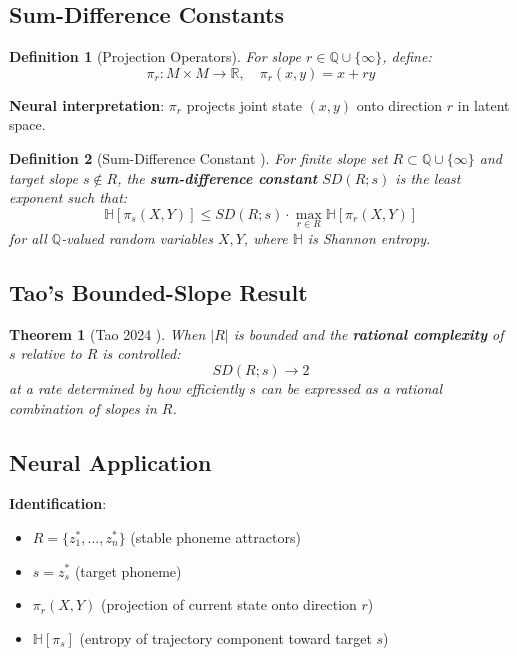 \documentclass[12pt]{article}
\newtheorem{theorem}{Theorem}
\newtheorem{definition}{Definition}
\begin{document}
\subsection{Sum-Difference Constants}

\begin{definition}[Projection Operators]
For slope $r \in \mathbb{Q} \cup \{\infty\}$, define:
\begin{equation}
\pi_r: M \times M \to \mathbb{R}, \quad \pi_r(x,y) = x + ry
\end{equation}
\end{definition}

\textbf{Neural interpretation}: $\pi_r$ projects joint state $(x,y)$ onto direction $r$ in latent space.

\begin{definition}[Sum-Difference Constant \cite{tao2024}]
For finite slope set $R \subset \mathbb{Q} \cup \{\infty\}$ and target slope $s \notin R$, the \textbf{sum-difference constant} $SD(R;s)$ is the least exponent such that:
\begin{equation}
\mathbb{H}[\pi_s(X,Y)] \le SD(R;s) \cdot \max_{r \in R} \mathbb{H}[\pi_r(X,Y)]
\end{equation}
for all $\mathbb{Q}$-valued random variables $X, Y$, where $\mathbb{H}$ is Shannon entropy.
\end{definition}

\subsection{Tao's Bounded-Slope Result}

\begin{theorem}[Tao 2024 \cite{tao2024}]
When $|R|$ is bounded and the \textbf{rational complexity} of $s$ relative to $R$ is controlled:
\begin{equation}
SD(R;s) \to 2
\end{equation}
at a rate determined by how efficiently $s$ can be expressed as a rational combination of slopes in $R$.
\end{theorem}

\subsection{Neural Application}

\textbf{Identification}:
\begin{itemize}
\item $R = \{z_1^*, \ldots, z_n^*\}$ (stable phoneme attractors)
\item $s = z_s^*$ (target phoneme)
\item $\pi_r(X,Y)$ (projection of current state onto direction $r$)
\item $\mathbb{H}[\pi_s]$ (entropy of trajectory component toward target $s$)
\end{itemize}
\end{document}

